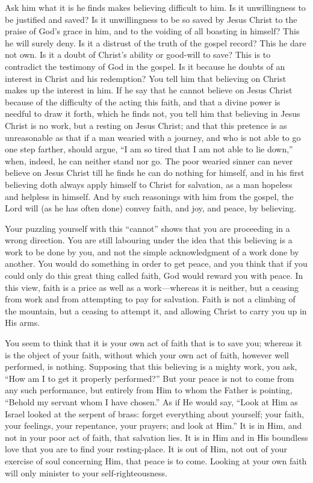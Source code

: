 \documentclass[
]{book}
\begin{document}
Ask him what it is he finds makes believing difficult to him. Is it unwillingness to be justified and saved? Is it unwillingness to be so saved by Jesus Christ to the praise of God's grace in him, and to the voiding of all boasting in himself? This he will surely deny. Is it a distrust of the truth of the gospel record? This he dare not own. Is it a doubt of Christ's ability or good-will to save? This is to contradict the testimony of God in the gospel. Is it because he doubts of an interest in Christ and his redemption? You tell him that believing on Christ makes up the interest in him. If he say that he cannot believe on Jesus Christ because of the difficulty of the acting this faith, and that a divine power is needful to draw it forth, which he finds not, you tell him that believing in Jesus Christ is no work, but a resting on Jesus Christ; and that this pretence is as unreasonable as that if a man wearied with a journey, and who is not able to go one step farther, should argue, ``I am so tired that I am not able to lie down,'' when, indeed, he can neither stand nor go. The poor wearied sinner can never believe on Jesus Christ till he finds he can do nothing for himself, and in his first believing doth always apply himself to Christ for salvation, as a man hopeless and helpless in himself. And by such reasonings with him from the gospel, the Lord will (as he has often done) convey faith, and joy, and peace, by believing.

Your puzzling yourself with this ``cannot'' shows that you are proceeding in a wrong direction. You are still labouring under the idea that this believing is a work to be done by you, and not the simple acknowledgment of a work done by another. You would do something in order to get peace, and you think that if you could only do this great thing called faith, God would reward you with peace. In this view, faith is a price as well as a work---whereas it is neither, but a ceasing from work and from attempting to pay for salvation. Faith is not a climbing of the mountain, but a ceasing to attempt it, and allowing Christ to carry you up in His arms.

You seem to think that it is your own act of faith that is to save you; whereas it is the object of your faith, without which your own act of faith, however well performed, is nothing. Supposing that this believing is a mighty work, you ask, ``How am I to get it properly performed?'' But your peace is not to come from any such performance, but entirely from Him to whom the Father is pointing, ``Behold my servant whom I have chosen.'' As if He would say, ``Look at Him as Israel looked at the serpent of brass: forget everything about yourself; your faith, your feelings, your repentance, your prayers; and look at Him.'' It is in Him, and not in your poor act of faith, that salvation lies. It is in Him and in His boundless love that you are to find your resting-place. It is out of Him, not out of your exercise of soul concerning Him, that peace is to come. Looking at your own faith will only minister to your self-righteousness.
\end{document}
